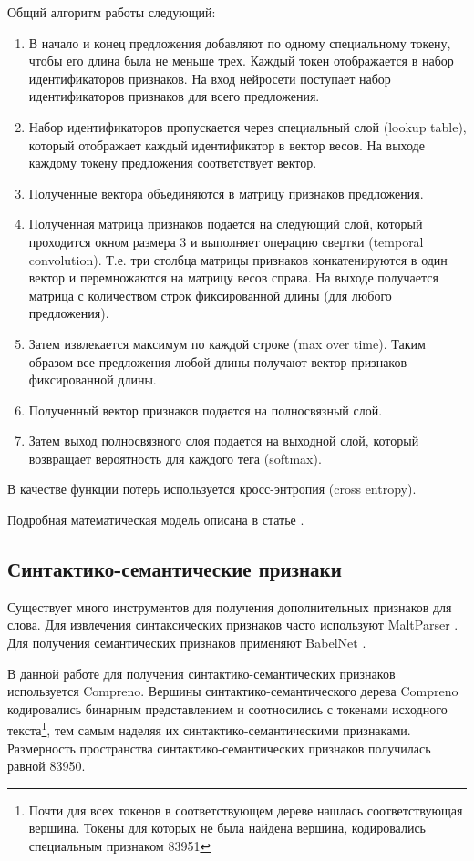\documentclass[a4paper,12pt]{article}
\begin{document}
  Общий алгоритм работы следующий:
  \begin{enumerate}
    \item В начало и конец предложения добавляют по одному специальному токену, чтобы его длина была
    не меньше трех. Каждый токен отображается в набор идентификаторов признаков.
    На вход нейросети поступает набор идентификаторов признаков для всего предложения.

    \item Набор идентификаторов пропускается через специальный слой (lookup table), который отображает
    каждый идентификатор в вектор весов. На выходе каждому токену предложения соответствует
    вектор.
    \item Полученные вектора объединяются в матрицу признаков предложения.
    \item Полученная матрица признаков подается на следующий
    слой, который проходится окном размера 3 и выполняет операцию свертки (temporal convolution).
    Т.е. три столбца матрицы признаков конкатенируются в один вектор и перемножаются
    на матрицу весов справа.
    На выходе получается матрица с количеством строк фиксированной длины (для любого предложения).
    \item Затем извлекается максимум по каждой строке (max over time).
    Таким образом все предложения любой длины получают вектор признаков фиксированной длины.
    \item Полученный вектор признаков подается на полносвязный слой.
    \item Затем выход полносвязного слоя подается на выходной слой, который возвращает вероятность
    для каждого тега (softmax).
  \end{enumerate}

  В качестве функции потерь используется кросс-энтропия (cross entropy).

  Подробная математическая модель описана в статье \citep{collobert2011natural}.

  \subsection{Синтактико-семантические признаки}
    Существует много инструментов для получения дополнительных признаков для слова.
    Для извлечения синтаксических признаков часто используют MaltParser \citep{nivre2006maltparser}.
    Для получения семантических признаков применяют BabelNet \citep{navigli2010babelnet}.

    В данной работе для получения синтактико-семантических признаков используется Compreno.
    Вершины синтактико-семантического дерева Compreno кодировались бинарным представлением
    и соотносились с токенами исходного
    текста\footnote{Почти для всех токенов в соответствующем дереве нашлась соответствующая вершина.
    Токены для которых не была найдена вершина, кодировались специальным признаком 83951},
    тем самым наделяя их синтактико-се\-ман\-ти\-ческими признаками.
    Размерность пространства синтактико-се\-ман\-ти\-ческих признаков получилась равной 83950.
\end{document}

